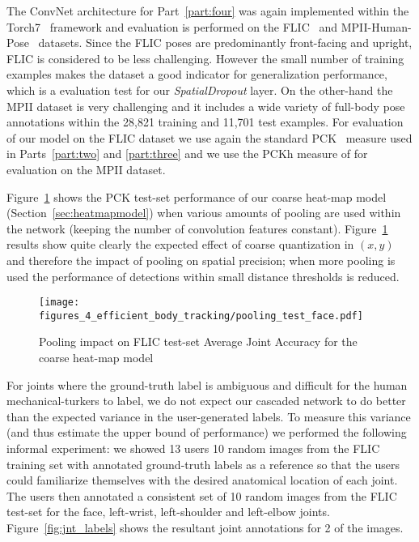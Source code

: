 The ConvNet architecture for Part~\ref{part:four} was again implemented within the Torch7~\cite{torch7} framework and evaluation is performed on the FLIC~\cite{modec} and MPII-Human-Pose~\cite{andriluka14cvpr} datasets. Since the FLIC poses are predominantly front-facing and upright, FLIC is considered to be less challenging. However the small number of training examples makes the dataset a good indicator for generalization performance, which is a evaluation test for our \textit{SpatialDropout} layer. On the other-hand the MPII dataset is very challenging and it includes a wide variety of full-body pose annotations within the 28,821 training and 11,701 test examples. For evaluation of our model on the FLIC dataset we use again the standard PCK~\cite{modec} measure used in Parts~\ref{part:two} and \ref{part:three} and we use the PCKh measure of \cite{andriluka14cvpr} for evaluation on the MPII dataset.

Figure~\ref{fig:pooling} shows the PCK test-set performance of our coarse heat-map model (Section~\ref{sec:heatmapmodel}) when various amounts of pooling are used within the network (keeping the number of convolution features constant). Figure~\ref{fig:pooling} results show quite clearly the expected effect of coarse quantization in $(x,y)$ and therefore the impact of pooling on spatial precision; when more pooling is used the performance of detections within small distance thresholds is reduced.

\begin{figure}[ht]
\centering
\texttt{[image: figures\_4\_efficient\_body\_tracking/pooling\_test\_face.pdf]}
   \caption{Pooling impact on FLIC test-set Average Joint Accuracy for the coarse heat-map model}
\label{fig:pooling}
\end{figure}

For joints where the ground-truth label is ambiguous and difficult for the human mechanical-turkers to label, we do not expect our cascaded network to do better than the expected variance in the user-generated labels. To measure this variance (and thus estimate the upper bound of performance) we performed the following informal experiment: we showed 13 users 10 random images from the FLIC training set with annotated ground-truth labels as a reference so that the users could familiarize themselves with the desired anatomical location of each joint. The users then annotated a consistent set of 10 random images from the FLIC test-set for the face, left-wrist, left-shoulder and left-elbow joints. Figure~\ref{fig:jnt_labels} shows the resultant joint annotations for 2 of the images.

